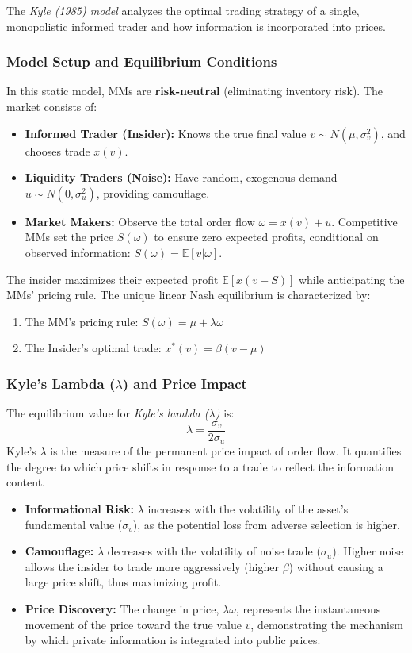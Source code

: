 The \textit{Kyle (1985) model} analyzes the optimal trading strategy of a single, monopolistic informed trader and how information is incorporated into prices.

\subsubsection{Model Setup and Equilibrium Conditions}
In this static model, MMs are \textbf{risk-neutral} (eliminating inventory risk). The market consists of:
\begin{itemize}
    \item \textbf{Informed Trader (Insider):} Knows the true final value $v \sim N(\mu, \sigma_v^2)$, and chooses trade $x(v)$.
    \item \textbf{Liquidity Traders (Noise):} Have random, exogenous demand $u \sim N(0, \sigma_u^2)$, providing camouflage.
    \item \textbf{Market Makers:} Observe the total order flow $\omega = x(v) + u$. Competitive MMs set the price $S(\omega)$ to ensure zero expected profits, conditional on observed information: $S(\omega) = \mathbb{E}[v | \omega]$.
\end{itemize}
The insider maximizes their expected profit $\mathbb{E}[x(v - S)]$ while anticipating the MMs' pricing rule. The unique linear Nash equilibrium is characterized by:
\begin{enumerate}
    \item The MM's pricing rule: $S(\omega) = \mu + \lambda \omega$
    \item The Insider's optimal trade: $x^*(v) = \beta (v - \mu)$
\end{enumerate}

\subsubsection{Kyle's Lambda ($\lambda$) and Price Impact}
The equilibrium value for \textit{Kyle's lambda ($\lambda$)} is:
\begin{equation}
    \lambda = \frac{\sigma_v}{2 \sigma_u}
\end{equation}
Kyle's $\lambda$ is the measure of the permanent price impact of order flow. It quantifies the degree to which price shifts in response to a trade to reflect the information content.
\begin{itemize}
    \item \textbf{Informational Risk:} $\lambda$ increases with the volatility of the asset's fundamental value ($\sigma_v$), as the potential loss from adverse selection is higher.
    \item \textbf{Camouflage:} $\lambda$ decreases with the volatility of noise trade ($\sigma_u$). Higher noise allows the insider to trade more aggressively (higher $\beta$) without causing a large price shift, thus maximizing profit.
    \item \textbf{Price Discovery:} The change in price, $\lambda \omega$, represents the instantaneous movement of the price toward the true value $v$, demonstrating the mechanism by which private information is integrated into public prices.
\end{itemize}

